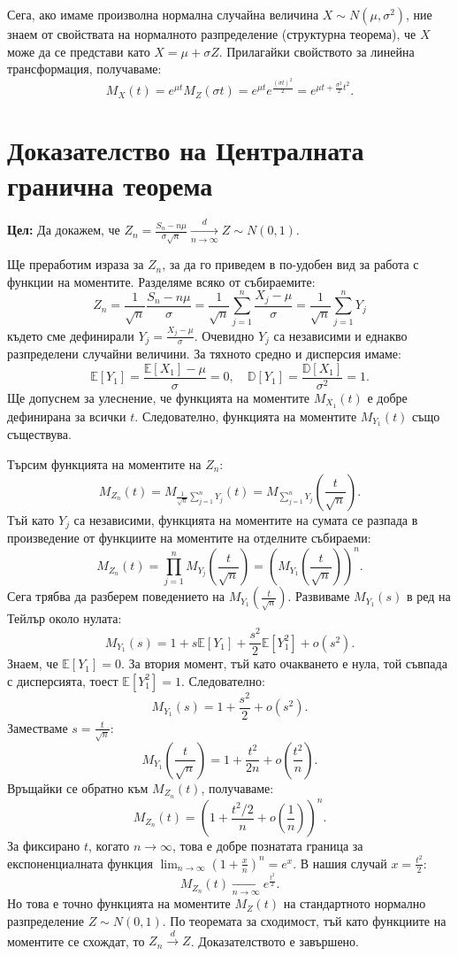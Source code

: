 \documentclass{article}
\begin{document}
Сега, ако имаме произволна нормална случайна величина $X \sim N(\mu, \sigma^2)$, ние знаем от свойствата на нормалното разпределение (структурна теорема), че $X$ може да се представи като $X = \mu + \sigma Z$. Прилагайки свойството за линейна трансформация, получаваме:
\[ M_X(t) = e^{\mu t} M_Z(\sigma t) = e^{\mu t} e^{\frac{(\sigma t)^2}{2}} = e^{\mu t + \frac{\sigma^2}{2} t^2}. \]

\section{Доказателство на Централната гранична теорема}

\textbf{Цел:} Да докажем, че $Z_n = \frac{S_n - n\mu}{\sigma \sqrt{n}} \xrightarrow[n \to \infty]{d} Z \sim N(0,1)$.

Ще преработим израза за $Z_n$, за да го приведем в по-удобен вид за работа с функции на моментите. Разделяме всяко от събираемите:
\[ Z_n = \frac{1}{\sqrt{n}} \frac{S_n - n\mu}{\sigma} = \frac{1}{\sqrt{n}} \sum_{j=1}^n \frac{X_j - \mu}{\sigma} = \frac{1}{\sqrt{n}} \sum_{j=1}^n Y_j \]
където сме дефинирали $Y_j = \frac{X_j - \mu}{\sigma}$. 
Очевидно $Y_j$ са независими и еднакво разпределени случайни величини. За тяхното средно и дисперсия имаме:
\[ \mathbb{E}[Y_1] = \frac{\mathbb{E}[X_1] - \mu}{\sigma} = 0, \quad \mathbb{D}[Y_1] = \frac{\mathbb{D}[X_1]}{\sigma^2} = 1. \]
Ще допуснем за улеснение, че функцията на моментите $M_{X_1}(t)$ е добре дефинирана за всички $t$. Следователно, функцията на моментите $M_{Y_1}(t)$ също съществува.

Търсим функцията на моментите на $Z_n$:
\[ M_{Z_n}(t) = M_{\frac{1}{\sqrt{n}} \sum_{j=1}^n Y_j}(t) = M_{\sum_{j=1}^n Y_j}\left(\frac{t}{\sqrt{n}}\right). \]
Тъй като $Y_j$ са независими, функцията на моментите на сумата се разпада в произведение от функциите на моментите на отделните събираеми:
\[ M_{Z_n}(t) = \prod_{j=1}^n M_{Y_j}\left(\frac{t}{\sqrt{n}}\right) = \left( M_{Y_1}\left(\frac{t}{\sqrt{n}}\right) \right)^n. \]
Сега трябва да разберем поведението на $M_{Y_1}\left(\frac{t}{\sqrt{n}}\right)$. Развиваме $M_{Y_1}(s)$ в ред на Тейлър около нулата:
\[ M_{Y_1}(s) = 1 + s\mathbb{E}[Y_1] + \frac{s^2}{2}\mathbb{E}[Y_1^2] + o(s^2). \]
Знаем, че $\mathbb{E}[Y_1] = 0$. За втория момент, тъй като очакването е нула, той съвпада с дисперсията, тоест $\mathbb{E}[Y_1^2] = 1$. Следователно:
\[ M_{Y_1}(s) = 1 + \frac{s^2}{2} + o(s^2). \]
Заместваме $s = \frac{t}{\sqrt{n}}$:
\[ M_{Y_1}\left(\frac{t}{\sqrt{n}}\right) = 1 + \frac{t^2}{2n} + o\left(\frac{t^2}{n}\right). \]
Връщайки се обратно към $M_{Z_n}(t)$, получаваме:
\[ M_{Z_n}(t) = \left( 1 + \frac{t^2 / 2}{n} + o\left(\frac{1}{n}\right) \right)^n. \]
За фиксирано $t$, когато $n \to \infty$, това е добре познатата граница за експоненциалната функция $\lim_{n \to \infty} (1 + \frac{x}{n})^n = e^x$. В нашия случай $x = \frac{t^2}{2}$:
\[ M_{Z_n}(t) \xrightarrow[n \to \infty]{} e^{\frac{t^2}{2}}. \]
Но това е точно функцията на моментите $M_Z(t)$ на стандартното нормално разпределение $Z \sim N(0,1)$. По теоремата за сходимост, тъй като функциите на моментите се схождат, то $Z_n \xrightarrow{d} Z$. Доказателството е завършено.
\end{document}
